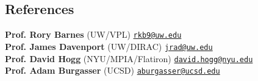 \documentclass[margin,line]{resume}
\begin{document}
\begin{resume}
\newpage


\section{\mysidestyle \textcolor{bcolor}{References}}
\textbf{Prof. Rory Barnes} (UW/VPL) \hfill {\tt \href{rkb9@uw.edu}{rkb9@uw.edu}} \\
\textbf{Prof. James Davenport} (UW/DIRAC) \hfill {\tt \href{jrad@uw.edu}{jrad@uw.edu}} \\
\textbf{Prof. David Hogg} (NYU/MPIA/Flatiron) \hfill {\tt \href{david.hogg@nyu.edu}{david.hogg@nyu.edu}}  \\
\textbf{Prof. Adam Burgasser} (UCSD) \hfill {\tt \href{aburgasser@ucsd.edu}{aburgasser@ucsd.edu}}   \\
 	       
\end{resume}   
\end{document}
